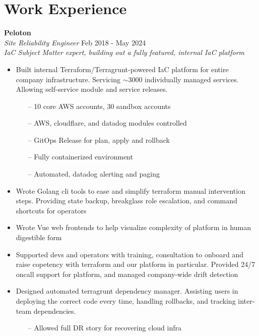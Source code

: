 \section{Work Experience}

\large{\textbf{Peloton}} \\
\textit{Site Reliability Engineer} \hfill Feb 2018 - May 2024 \\[3.75pt]
\textit{IaC Subject Matter expert, building out a fully featured, internal IaC platform}

\begin{minipage}[t]{\linewidth}
  \begin{itemize}
    \item Built internal Terraform/Terragrunt-powered IaC platform for entire company infrastructure. Servicing $\sim$3000 individually managed services. Allowing self-service module and service releases.
              \begin{itemize}
                  \item[--] 10 core AWS accounts, 30 sandbox accounts
                  \item[--] AWS, cloudflare, and datadog modules controlled
                  \item[--] GitOps Release for plan, apply and rollback
                  \item[--] Fully containerized environment
                  \item[--] Automated, datadog alerting and paging
              \end{itemize}
    \item Wrote Golang cli tools to ease and simplify terraform manual intervention steps. Providing state backup, breakglass role escalation, and command shortcuts for operators
    \item Wrote Vue web frontends to help visualize complexity of platform in human digestible form
    \item Supported devs and operators with training, consultation to onboard and raise copetency with terraform and our platform in particular. Provided 24/7 oncall support for platform, and managed company-wide drift detection
    \item Designed automated terragrunt dependency manager. Assisting users in deploying the correct code every time, handling rollbacks, and tracking inter-team dependencies.
      \begin{itemize}
        \item[--] Allowed full DR story for recovering cloud infra

\end{itemize}
\end{itemize}
\end{minipage}
